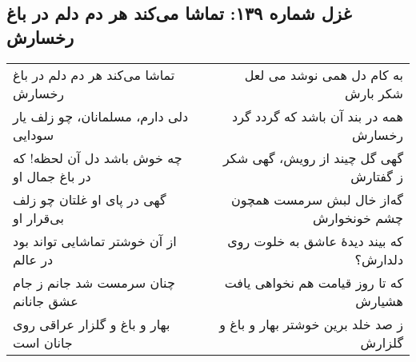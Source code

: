 \begin{center}
\section*{غزل شماره ۱۳۹: تماشا می‌کند هر دم دلم در باغ رخسارش}
\label{sec:139}
\begin{longtable}{l p{0.5cm} r}
تماشا می‌کند هر دم دلم در باغ رخسارش
&&
به کام دل همی نوشد می لعل شکر بارش
\\
دلی دارم، مسلمانان، چو زلف یار سودایی
&&
همه در بند آن باشد که گردد گرد رخسارش
\\
چه خوش باشد دل آن لحظه! که در باغ جمال او
&&
گهی گل چیند از رویش، گهی شکر ز گفتارش
\\
گهی در پای او غلتان چو زلف بی‌قرار او
&&
گه‌از خال لبش سرمست همچون چشم خونخوارش
\\
از آن خوشتر تماشایی تواند بود در عالم
&&
که بیند دیدهٔ عاشق به خلوت روی دلدارش؟
\\
چنان سرمست شد جانم ز جام عشق جانانم
&&
که تا روز قیامت هم نخواهی یافت هشیارش
\\
بهار و باغ و گلزار عراقی روی جانان است
&&
ز صد خلد برین خوشتر بهار و باغ و گلزارش
\\
\end{longtable}
\end{center}
